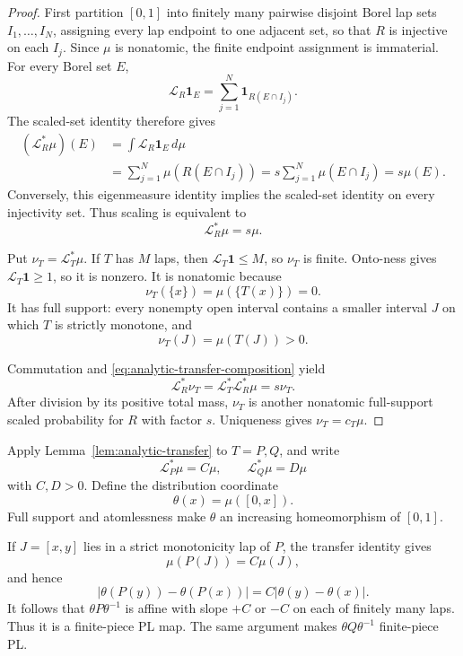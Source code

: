 \documentclass[11pt]{article}
\theoremstyle{definition}
\theoremstyle{remark}
\newcommand{\I}{[0,1]}
\begin{document}
\begin{proof}
First partition \(\I\) into finitely many pairwise disjoint Borel lap sets
\(I_1,\ldots,I_N\), assigning every lap endpoint to one adjacent set, so
that \(R\) is injective on each \(I_j\).  Since \(\mu\) is nonatomic, the
finite endpoint assignment is immaterial.  For every Borel set \(E\),
\[
 \mathcal L_R\mathbf1_E
 =\sum_{j=1}^N\mathbf1_{R(E\cap I_j)}.
\]
The scaled-set identity therefore gives
\[
\begin{split}
 (\mathcal L_R^*\mu)(E)
 &=\int\mathcal L_R\mathbf1_E\,d\mu\\
 &=\sum_{j=1}^N\mu(R(E\cap I_j))
 =s\sum_{j=1}^N\mu(E\cap I_j)
 =s\mu(E).
\end{split}
\]
Conversely, this eigenmeasure identity implies the scaled-set identity on
every injectivity set.  Thus scaling is equivalent to
\begin{equation}\label{eq:analytic-R-eigenmeasure}
 \mathcal L_R^*\mu=s\mu.
\end{equation}

Put \(\nu_T=\mathcal L_T^*\mu\).  If \(T\) has \(M\) laps, then
\(\mathcal L_T\mathbf1\leq M\), so \(\nu_T\) is finite.  Onto-ness gives
\(\mathcal L_T\mathbf1\geq1\), so it is nonzero.  It is nonatomic because
\[
 \nu_T(\{x\})=\mu(\{T(x)\})=0.
\]
It has full support: every nonempty open interval contains a smaller interval
\(J\) on which \(T\) is strictly monotone, and
\[
 \nu_T(J)=\mu(T(J))>0.
\]

Commutation and \eqref{eq:analytic-transfer-composition} yield
\[
 \mathcal L_R^*\nu_T
 =\mathcal L_T^*\mathcal L_R^*\mu
 =s\nu_T.
\]
After division by its positive total mass, \(\nu_T\) is another nonatomic
full-support scaled probability for \(R\) with factor \(s\).  Uniqueness
gives \(\nu_T=c_T\mu\).
\end{proof}

Apply Lemma~\ref{lem:analytic-transfer} to \(T=P,Q\), and write
\[
 \mathcal L_P^*\mu=C\mu,\qquad
 \mathcal L_Q^*\mu=D\mu
\]
with \(C,D>0\).  Define the distribution coordinate
\begin{equation}\label{eq:analytic-distribution}
 \theta(x)=\mu([0,x]).
\end{equation}
Full support and atomlessness make \(\theta\) an increasing homeomorphism of
\(\I\).

If \(J=[x,y]\) lies in a strict monotonicity lap of \(P\), the transfer
identity gives
\[
 \mu(P(J))=C\mu(J),
\]
and hence
\[
 |\theta(P(y))-\theta(P(x))|
 =C|\theta(y)-\theta(x)|.
\]
It follows that \(\theta P\theta^{-1}\) is affine with slope \(+C\) or
\(-C\) on each of finitely many laps.  Thus it is a finite-piece PL map.
The same argument makes \(\theta Q\theta^{-1}\) finite-piece PL.
\end{document}
